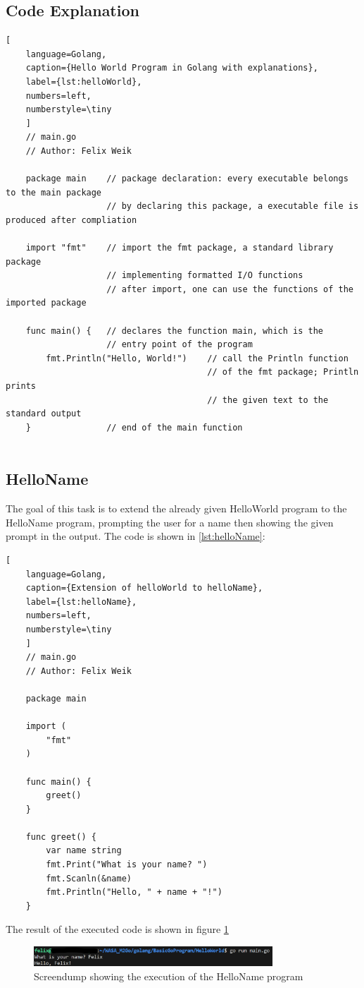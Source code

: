 \subsection{Code Explanation}
\begin{lstlisting}[
    language=Golang,
    caption={Hello World Program in Golang with explanations},
    label={lst:helloWorld},
    numbers=left,
    numberstyle=\tiny
    ]
    // main.go 
    // Author: Felix Weik

    package main    // package declaration: every executable belongs to the main package
                    // by declaring this package, a executable file is produced after compliation
    
    import "fmt"    // import the fmt package, a standard library package 
                    // implementing formatted I/O functions
                    // after import, one can use the functions of the imported package

    func main() {   // declares the function main, which is the 
                    // entry point of the program
        fmt.Println("Hello, World!")    // call the Println function 
                                        // of the fmt package; Println prints 
                                        // the given text to the standard output
    }               // end of the main function
    
\end{lstlisting}

\subsection{HelloName}
The goal of this task is to extend the already given HelloWorld program to the HelloName program, prompting the user for a name then showing the given prompt in the output.
The code is shown in \ref{lst:helloName}:
\begin{lstlisting}[
    language=Golang,
    caption={Extension of helloWorld to helloName},
    label={lst:helloName},
    numbers=left,
    numberstyle=\tiny
    ]
    // main.go
    // Author: Felix Weik

    package main

    import (
        "fmt"
    )

    func main() {
        greet()
    }

    func greet() {
        var name string
        fmt.Print("What is your name? ")
        fmt.Scanln(&name)
        fmt.Println("Hello, " + name + "!")
    } 
\end{lstlisting}

The result of the executed code is shown in figure \ref{fig:screendump_helloName}

\begin{figure}
    \centering
    \includegraphics[width=0.8\textwidth]{figures/goLang/helloWorld/golang_helloWorld_helloName.png}
    \caption{Screendump showing the execution of the HelloName program}
    \label{fig:screendump_helloName}
\end{figure}